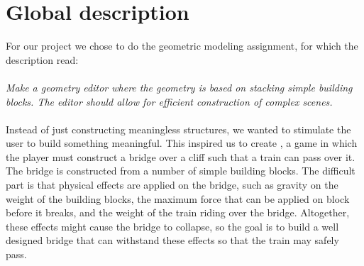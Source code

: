 \section{Global description}
For our project we chose to do the geometric modeling assignment, for which the description read:\\
\\
\textit{Make a geometry editor where the geometry is based on stacking simple building blocks. The editor should allow for efficient construction of complex scenes.}\\
\\
Instead of just constructing meaningless structures, we wanted to stimulate the user to build something meaningful. This inspired us to create \name, a game in which the player must construct a bridge over a cliff such that a train can pass over it. The bridge is constructed from a number of simple building blocks. The difficult part is that physical effects are applied on the bridge, such as gravity on the weight of the building blocks, the maximum force that can be applied on  block before it breaks, and the weight of the train riding over the bridge. Altogether, these effects might cause the bridge to collapse, so the goal is to build a well designed bridge that can withstand these effects so that the train may safely pass.